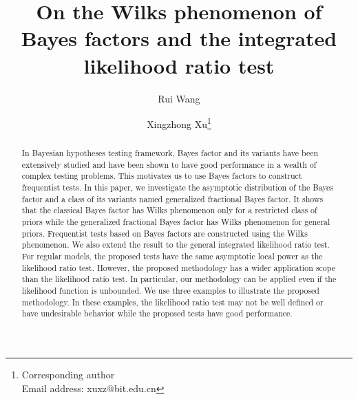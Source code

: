 \documentclass[11pt]{article}
\theoremstyle{plain}
\theoremstyle{definition}
\theoremstyle{remark}
\begin{document}
\title{On the Wilks phenomenon of Bayes factors and the integrated likelihood ratio test}
\author[1]{Rui Wang}
\author[1,2]{Xingzhong Xu\thanks{Corresponding author\\Email address: xuxz@bit.edu.cn}}

\maketitle


\begin{abstract}
In Bayesian hypotheses testing framework, Bayes factor and its variants have been extensively studied and have been shown to have good performance in a wealth of complex testing problems.
This motivates us to use Bayes factors to construct frequentist tests.
In this paper, we investigate the asymptotic distribution of the Bayes factor and a class of its variants named generalized fractional Bayes factor.
It shows that the classical Bayes factor has Wilks phenomenon only for a restricted class of priors while the generalized fractional Bayes factor has Wilks phenomenon for general priors.
Frequentist tests based on Bayes factors are constructed using the Wilks phenomenon.
We also extend the result to the general integrated likelihood ratio test.
For regular models, the proposed tests have the same asymptotic local power as the likelihood ratio test.
However, %
the proposed methodology has a wider application scope than the likelihood ratio test.
In particular, our methodology can be applied even if the likelihood function is unbounded.
We use three examples to illustrate the proposed methodology.
In these examples, the likelihood ratio test may not be well defined or have undesirable behavior while the proposed tests have good performance.
\end{abstract}
\end{document}
